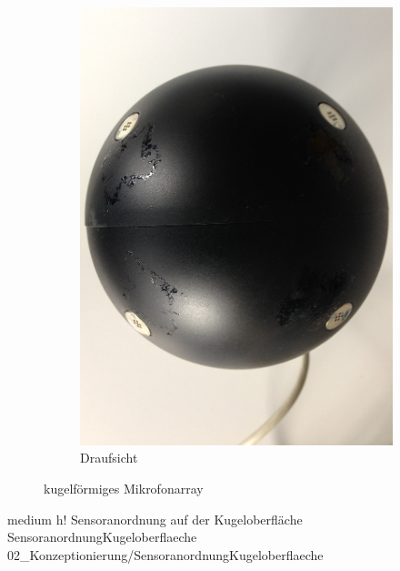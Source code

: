 \begin{figure}
\begin{subfigure}[b]{0.35\textwidth}
                \includegraphics[width=\textwidth]{images/02_Konzeptionierung/Foto_MikrofonArray_Draufsicht}
                \caption{Draufsicht}
                \label{fig:Foto_MikrofonArray_Draufsicht}
        \end{subfigure}
        \caption{kugelförmiges Mikrofonarray}
        \label{fig:Foto_KugelfoermigesMikrofonarray}
\end{figure}




         {medium}                 %
         {h!}             %
         {Sensoranordnung auf der Kugeloberfläche}                %
         {SensoranordnungKugeloberflaeche}                %
         {02_Konzeptionierung/SensoranordnungKugeloberflaeche}     %








